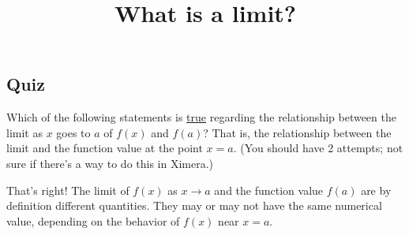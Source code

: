 \documentclass{ximera}
\title{What is a limit?}
\begin{document}
\begin{abstract}
\end{abstract}

\subsection{Quiz}

\begin{question}  
Which of the following statements is \underline{true} regarding the relationship between the limit as $x$ goes to $a$ of $f(x)$ and $f(a)$?  That is, the relationship between the limit and the function value at the point $x=a$. (You should have 2 attempts; not sure if there's a way to do this in Ximera.)
\begin{multipleChoice}  
\end{multipleChoice}  

\begin{explanation}
    That's right! The limit of $f(x)$ as $x \to a$ and the function value $f(a)$ are by definition different quantities. They may or may not have the same numerical value, depending on the behavior of $f(x)$ near $x=a$.
\end{explanation}
\end{question}
\end{document}
